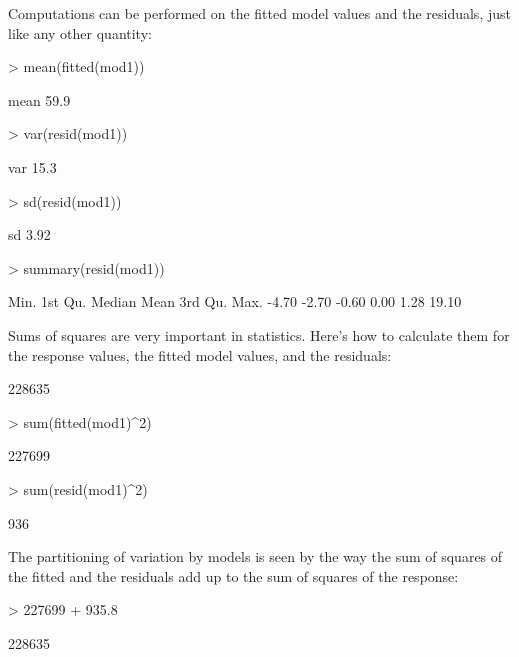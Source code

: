 Computations can be performed on the fitted model values and the
residuals, just like any other quantity:
\begin{Schunk}
\begin{Sinput}
> mean(fitted(mod1))
\end{Sinput}
\begin{Soutput}
mean 
59.9 
\end{Soutput}
\begin{Sinput}
> var(resid(mod1))
\end{Sinput}
\begin{Soutput}
 var 
15.3 
\end{Soutput}
\begin{Sinput}
> sd(resid(mod1))
\end{Sinput}
\begin{Soutput}
  sd 
3.92 
\end{Soutput}
\begin{Sinput}
> summary(resid(mod1))
\end{Sinput}
\begin{Soutput}
   Min. 1st Qu.  Median    Mean 3rd Qu.    Max. 
  -4.70   -2.70   -0.60    0.00    1.28   19.10 
\end{Soutput}
\end{Schunk}

Sums of squares are very important in statistics.  Here's how to
calculate them for the response values, the fitted model values, and
the residuals:
\begin{Schunk}
\begin{Soutput}
[1] 228635
\end{Soutput}
\begin{Sinput}
> sum(fitted(mod1)^2)
\end{Sinput}
\begin{Soutput}
[1] 227699
\end{Soutput}
\begin{Sinput}
> sum(resid(mod1)^2)
\end{Sinput}
\begin{Soutput}
[1] 936
\end{Soutput}
\end{Schunk}
The partitioning of variation by models is seen by the way 
the sum of squares of the fitted and the residuals add up to the sum of squares of the response:
\begin{Schunk}
\begin{Sinput}
> 227699 + 935.8
\end{Sinput}
\begin{Soutput}
[1] 228635
\end{Soutput}
\end{Schunk}

